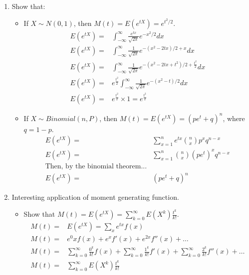 \documentclass{article}
\begin{document}
\begin{enumerate}
\item Show that:
    \begin{itemize}
    \item If $X \sim N(0,1)$, then $M(t)=E(e^{tX})=e^{t^2/2}$.
        \begin{equation*}
        \begin{aligned}
        E(e^{tX}) = & \int_{-\infty}^{\infty} \frac{e^{tx}}{\sqrt{2\pi}} e^{-x^2 / 2} dx \\
        E(e^{tX}) = & \int_{-\infty}^{\infty} \frac{1}{\sqrt{2\pi}} e^{-(x^2 - 2tx) / 2 + x} dx \\
        E(e^{tX}) = & \int_{-\infty}^{\infty} \frac{1}{\sqrt{2\pi}} e^{-(x^2 - 2tx + t^2) / 2 + \frac{t^2}{2}} dx \\
        E(e^{tX}) = & e^{\frac{t^2}{2}} \int_{-\infty}^{\infty} \frac{1}{\sqrt{2\pi}} e^{-(x^2 - t) / 2} dx \\
        E(e^{tX}) = & e^{\frac{t^2}{2}} \times 1 = e^{\frac{t^2}{2}}
        \end{aligned}
        \end{equation*}
    \item If $X\sim Binomial (n,P)$, then $M(t)=E(e^{tX})=(pe^t+q)^n$, where $q=1-p$.
        \begin{equation*}
        \begin{aligned}
            E(e^{tX}) = & \sum_{x = 1}^n e^{tx} \binom{n}{x} p^x q^{n - x} \\
            E(e^{tX}) = & \sum_{x = 1}^n \binom{n}{x} (pe^t)^x q^{n - x} \\
            \text{Then, by the binomial theorem...} \\
            E(e^{tX}) = & (pe^t + q)^n
        \end{aligned}
        \end{equation*}
    \end{itemize}

\item Interesting application of moment generating function.
    \begin{itemize}
    \item Show that $M(t)=E(e^{tX})=\sum_{k=0}^\infty E(X^k) \frac{t^k}{k!}$.
        \begin{equation*}
        \begin{aligned}
            M(t) =& E(e^{tX}) = \sum_x e^{tx}f(x) \\
            M(t) =& e^0x f(x) + e^{x} f'(x) + e^{2x} f''(x) + \ldots \\
            M(t) =& \sum_{k=0}^\infty \frac{0^k}{k!} f(x) + \sum_{k=0}^\infty \frac{1^k}{k!} f'(x) + \sum_{k=0}^\infty \frac{2^k}{k!} f''(x) + \ldots \\
            M(t) =& \sum_{k=0}^\infty E(X^k) \frac{t^k}{k!}
        \end{aligned}
        \end{equation*}


\end{itemize}
\end{enumerate}
\end{document}
